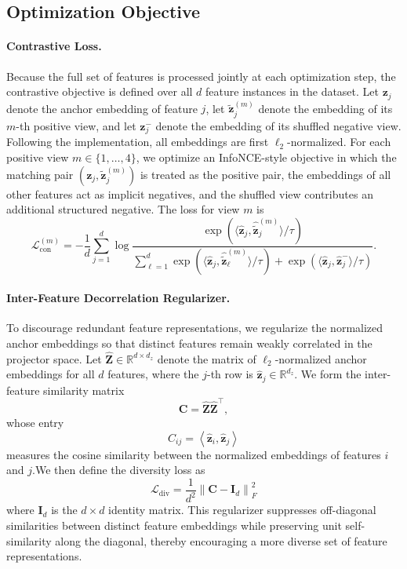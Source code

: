 \documentclass[sigconf,natbib=true,anonymous=true]{acmart}
\begin{document}
\subsection{Optimization Objective}
\paragraph{Contrastive Loss.}
Because the full set of features is processed jointly at each optimization step,
the contrastive objective is defined over all $d$ feature instances in the
dataset. Let $\mathbf{z}_j$ denote the anchor embedding of feature $j$, let
$\tilde{\mathbf{z}}_j^{(m)}$ denote the embedding of its $m$-th positive view,
and let $\mathbf{z}_j^{-}$ denote the embedding of its shuffled negative view.
Following the implementation, all embeddings are first $\ell_2$-normalized. For
each positive view $m \in \{1,\dots,4\}$, we optimize an InfoNCE-style
objective in which the matching pair
$(\mathbf{z}_j,\tilde{\mathbf{z}}_j^{(m)})$ is treated as the positive pair,
the embeddings of all other features act as implicit negatives, and the
shuffled view contributes an additional structured negative. The loss for view
$m$ is
\[
\mathcal{L}_{\mathrm{con}}^{(m)}
=
-\frac{1}{d}\sum_{j=1}^{d}
\log
\frac{
\exp\!\left(\langle \hat{\mathbf{z}}_j, \hat{\tilde{\mathbf{z}}}_j^{(m)} \rangle / \tau\right)
}{
\sum_{\ell=1}^{d}
\exp\!\left(\langle \hat{\mathbf{z}}_j, \hat{\tilde{\mathbf{z}}}_\ell^{(m)} \rangle / \tau\right)
+
\exp\!\left(\langle \hat{\mathbf{z}}_j, \hat{\mathbf{z}}_j^{-} \rangle / \tau\right)
}.
\]

\paragraph{Inter-Feature Decorrelation Regularizer.}
To discourage redundant feature representations, we regularize the normalized
anchor embeddings so that distinct features remain weakly correlated in the
projector space. Let $\hat{\mathbf{Z}} \in \mathbb{R}^{d \times d_z}$ denote the
matrix of $\ell_2$-normalized anchor embeddings for all $d$ features, where the
$j$-th row is $\hat{\mathbf{z}}_j \in \mathbb{R}^{d_z}$. We form the
inter-feature similarity matrix
\[
\mathbf{C} = \hat{\mathbf{Z}}\hat{\mathbf{Z}}^\top,
\]
whose entry
\[
C_{ij} = \left\langle \hat{\mathbf{z}}_i, \hat{\mathbf{z}}_j \right\rangle
\]
measures the cosine similarity between the normalized embeddings of features
$i$ and $j$.We then define the diversity loss as
\[
\mathcal{L}_{\mathrm{div}}
=
\frac{1}{d^2}
\left\|
\mathbf{C} - \mathbf{I}_d
\right\|_F^2
\]
where $\mathbf{I}_d$ is the $d \times d$ identity matrix. This regularizer suppresses off-diagonal similarities
between distinct feature embeddings while preserving unit self-similarity along
the diagonal, thereby encouraging a more diverse set of feature
representations.
\end{document}
